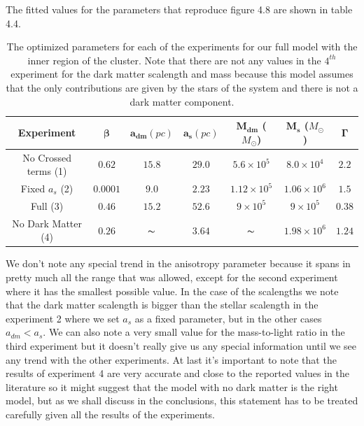The fitted values for the parameters that reproduce figure 4.8 are shown in table 4.4.

\begin{table}[]
\centering
\begin{tabular}{| c | c | c | c | c | c | c| }
    \hline
    \textbf{Experiment} & $\mathbf{\beta}$ & $\mathbf{a_{dm}} (pc)$ & $\mathbf{a_{s}} (pc)$ & $\mathbf{M_{dm}}$ ($M_{\odot}$) & $\mathbf{M_{s}}$ ($M_{\odot}$) & $\mathbf{\Gamma}$\\ \hline
	No Crossed terms (1) & $0.62$ &	$15.8$ &	$29.0$ &	$5.6 \times 10^{5}$ &	$8.0 \times 10^{4}$ &	$2.2$\\ \hline
	Fixed $a_s$ (2) &	$0.0001$ &	$9.0$ &	$2.23$ &	$1.12 \times 10^{5}$ &	$1.06 \times 10 ^{6}$ &	$1.5$\\ \hline
	Full (3) &	$0.46$ &	$15.2$ &	$52.6$ &	$9 \times 10^{5}$ &	$9 \times 10^{5}$ &	$0.38$\\ \hline
	No Dark Matter (4) &	$0.26$ & $\thicksim$	& $3.64$  & $\thicksim$ & $  1.98 \times 10^{6}$ & 	$1.24$\\
    \hline
  \end{tabular} 
\caption[Optimized parameters for our full model with the inner region.]{The optimized parameters for each of the experiments for our full model with the inner region of the cluster. Note that there are not any values in the $4 ^{th}$ experiment for the dark matter scalength and mass because this model assumes that the only contributions are given by the stars of the system and there is not a dark matter component.}
\end{table}

We don't note any special trend in the anisotropy parameter because it spans in pretty much all the range that was allowed, except for the second experiment where it has the smallest possible value. In the case of the scalengths we note that the dark matter scalength is bigger than the stellar scalength in the experiment 2 where we set $a_s$ as a fixed parameter, but in the other cases $a_{dm}<a_s$. We can also note a very small value for the mass-to-light ratio in the third experiment but it doesn't really give us any special information until we see any trend with the other experiments. At last it's important to note that the results of experiment 4 are very accurate and close to the reported values in the literature so it might suggest that the model with no dark matter is the right model, but as we shall discuss in the conclusions, this statement has to be treated carefully given all the results of the experiments.

